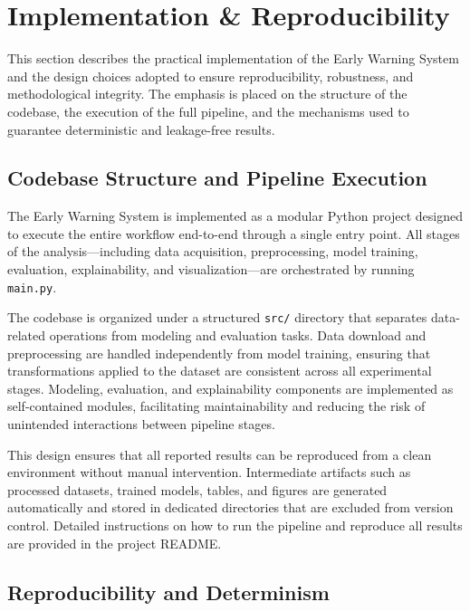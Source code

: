 \documentclass[11pt,a4paper]{article}
\begin{document}
\section{Implementation \& Reproducibility}
\label{sec:implementation_reproducibility}

This section describes the practical implementation of the Early Warning System and the design choices adopted to ensure reproducibility, robustness, and methodological integrity. The emphasis is placed on the structure of the codebase, the execution of the full pipeline, and the mechanisms used to guarantee deterministic and leakage-free results.

\subsection{Codebase Structure and Pipeline Execution}
\label{subsec:codebase}

The Early Warning System is implemented as a modular Python project designed to execute the entire workflow end-to-end through a single entry point. All stages of the analysis—including data acquisition, preprocessing, model training, evaluation, explainability, and visualization—are orchestrated by running \texttt{main.py}.

The codebase is organized under a structured \texttt{src/} directory that separates data-related operations from modeling and evaluation tasks. Data download and preprocessing are handled independently from model training, ensuring that transformations applied to the dataset are consistent across all experimental stages. Modeling, evaluation, and explainability components are implemented as self-contained modules, facilitating maintainability and reducing the risk of unintended interactions between pipeline stages.

This design ensures that all reported results can be reproduced from a clean environment without manual intervention. Intermediate artifacts such as processed datasets, trained models, tables, and figures are generated automatically and stored in dedicated directories that are excluded from version control. Detailed instructions on how to run the pipeline and reproduce all results are provided in the project README.

\subsection{Reproducibility and Determinism}
\label{subsec:determinism}
\end{document}

